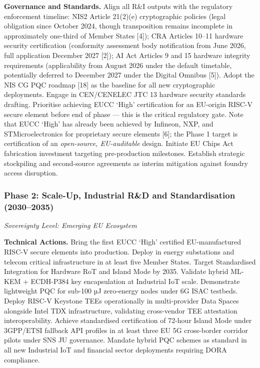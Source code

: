 \documentclass{ieeeaccess}
\begin{document}
\textbf{Governance and Standards.} Align all R\&I outputs with the
regulatory enforcement timeline: NIS2 Article 21(2)(e) cryptographic
policies (legal obligation since October 2024, though transposition
remains incomplete in approximately one-third of Member States {[}4{]});
CRA Articles 10--11 hardware security certification (conformity
assessment body notification from June 2026, full application December
2027 {[}2{]}); AI Act Articles 9 and 15 hardware integrity requirements
(applicability from August 2026 under the default timetable, potentially
deferred to December 2027 under the Digital Omnibus {[}5{]}). Adopt the
NIS CG PQC roadmap {[}18{]} as the baseline for all new cryptographic
deployments. Engage in CEN/CENELEC JTC 13 hardware security standards
drafting. Prioritise achieving EUCC `High' certification for an
EU-origin RISC-V secure element before end of phase --- this is the
critical regulatory gate. Note that EUCC `High' has already been
achieved by Infineon, NXP, and STMicroelectronics for proprietary secure
elements {[}6{]}; the Phase 1 target is certification of an
\emph{open-source, EU-auditable} design. Initiate EU Chips Act
fabrication investment targeting pre-production milestones. Establish
strategic stockpiling and second-source agreements as interim mitigation
against foundry access disruption.

\subsubsection{Phase 2: Scale-Up, Industrial R\&D and Standardisation
(2030--2035)}\label{phase-2-scale-up-industrial-rd-and-standardisation-20302035}

\emph{Sovereignty Level: Emerging EU Ecosystem}

\textbf{Technical Actions.} Bring the first EUCC `High' certified
EU-manufactured RISC-V secure elements into production. Deploy in energy
substations and telecom critical infrastructure in at least five Member
States. Target Standardised Integration for Hardware RoT and Island Mode
by 2035. Validate hybrid ML-KEM + ECDH-P384 key encapsulation at
Industrial IoT scale. Demonstrate lightweight PQC for sub-100 µJ
zero-energy nodes under 6G ISAC testbeds. Deploy RISC-V Keystone TEEs
operationally in multi-provider Data Spaces alongside Intel TDX
infrastructure, validating cross-vendor TEE attestation
interoperability. Achieve standardised certification of 72-hour Island
Mode under 3GPP/ETSI fallback API profiles in at least three EU 5G
cross-border corridor pilots under SNS JU governance. Mandate hybrid PQC
schemes as standard in all new Industrial IoT and financial sector
deployments requiring DORA compliance.
\end{document}
